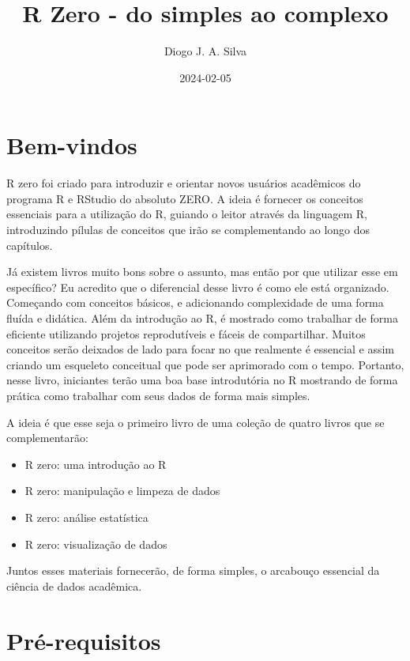 \documentclass[
]{book}
\title{R Zero - do simples ao complexo}
\author{Diogo J. A. Silva}
\date{2024-02-05}
\providecommand{\tightlist}{%
  \setlength{\itemsep}{0pt}\setlength{\parskip}{0pt}}
\begin{document}
\maketitle

{
\setcounter{tocdepth}{1}
\tableofcontents
}
\hypertarget{bem-vindos}{%
\chapter{Bem-vindos}\label{bem-vindos}}

R zero foi criado para introduzir e orientar novos usuários acadêmicos do programa R e RStudio do absoluto ZERO. A ideia é fornecer os conceitos essenciais para a utilização do R, guiando o leitor através da linguagem R, introduzindo pílulas de conceitos que irão se complementando ao longo dos capítulos.

Já existem livros muito bons sobre o assunto, mas então por que utilizar esse em específico? Eu acredito que o diferencial desse livro é como ele está organizado. Começando com conceitos básicos, e adicionando complexidade de uma forma fluída e didática. Além da introdução ao R, é mostrado como trabalhar de forma eficiente utilizando projetos reprodutíveis e fáceis de compartilhar. Muitos conceitos serão deixados de lado para focar no que realmente é essencial e assim criando um esqueleto conceitual que pode ser aprimorado com o tempo. Portanto, nesse livro, iniciantes terão uma boa base introdutória no R mostrando de forma prática como trabalhar com seus dados de forma mais simples.

A ideia é que esse seja o primeiro livro de uma coleção de quatro livros que se complementarão:

\begin{itemize}
\tightlist
\item
  R zero: uma introdução ao R
\item
  R zero: manipulação e limpeza de dados
\item
  R zero: análise estatística
\item
  R zero: visualização de dados
\end{itemize}

Juntos esses materiais fornecerão, de forma simples, o arcabouço essencial da ciência de dados acadêmica.

\hypertarget{pruxe9-requisitos}{%
\chapter{Pré-requisitos}\label{pruxe9-requisitos}}
\end{document}
